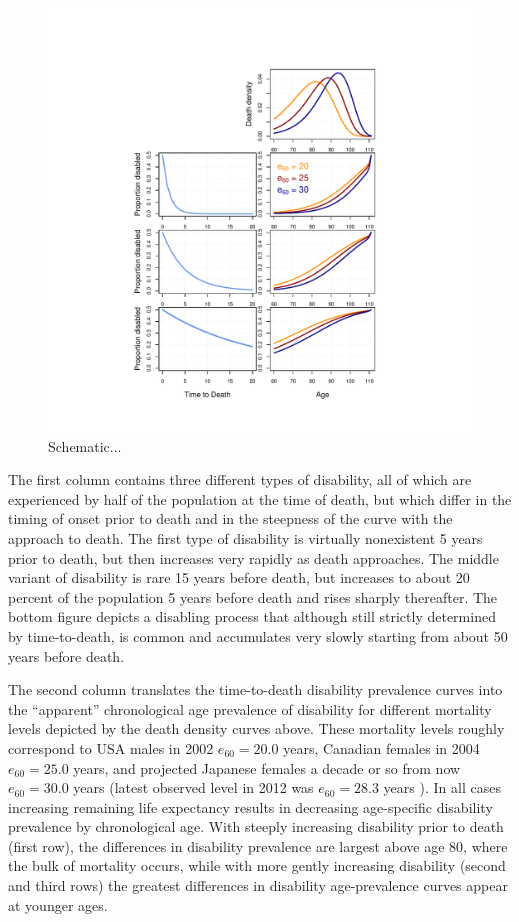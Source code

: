 \documentclass[11pt,oneside,a4paper]{article} %
\begin{document}
\begin{figure}
\begin{adjustwidth}{-1.5cm}{}
	\centering
	\includegraphics[scale=.8]{schematic3.pdf}
	\caption{Schematic...}
	\label{fig:Fig_schematic3}
\end{adjustwidth}
\end{figure}

The first column contains three different types of disability, all of which are
experienced by half of the population at the time of death, but which differ in
the timing of onset prior to death and in the steepness of the curve with the
approach to death.
The first type of disability is virtually nonexistent 5 years prior to death, but then increases very rapidly as death approaches. The middle variant of disability is rare 15 years before death, but increases to about 20 percent of the population 5 years before death and rises sharply thereafter. The bottom figure depicts a disabling process that although still strictly determined by time-to-death, is common and accumulates very slowly starting from about 50 years before death.

The second column translates the time-to-death disability prevalence curves into
the ``apparent'' chronological age prevalence of disability for different
mortality levels depicted by the death density curves above. These mortality
levels roughly correspond to USA males in 2002 $e_{60} = 20.0$ years, Canadian
females in 2004 $e_{60} = 25.0$ years, and projected Japanese females a decade
or so from now $e_{60} = 30.0$ years (latest observed level in 2012 was $e_{60}
= 28.3$ years \citep{HMD2015}). In all cases increasing remaining life
expectancy results in decreasing age-specific disability prevalence by
chronological age. With steeply increasing disability prior to death (first
row), the differences in disability prevalence are largest above age 80, where
the bulk of mortality occurs, while with more gently increasing disability
(second and third rows) the greatest differences in disability age-prevalence
curves appear at younger ages.
\end{document}
